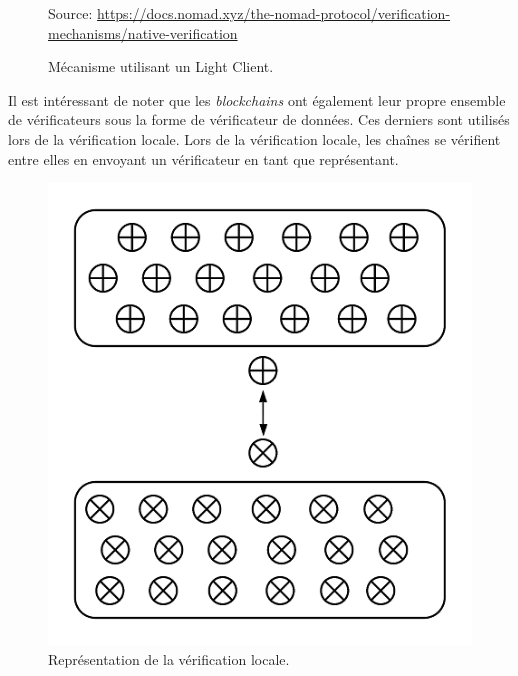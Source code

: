\begin{figure}[h!]
    \centering
{}
    {\scriptsize
            Source: \url{https://docs.nomad.xyz/the-nomad-protocol/verification-mechanisms/native-verification}}
    \caption{Mécanisme utilisant un Light Client.}
    \label{fig:LightClient}
\end{figure}

\pagebreak
Il est intéressant de noter que les \textit{blockchains} ont également leur propre ensemble de vérificateurs sous la forme de vérificateur de données. Ces derniers sont utilisés lors de la vérification locale. Lors de la vérification locale, les chaînes se vérifient entre elles en envoyant un vérificateur en tant que représentant.

\begin{figure}[h]
    \centering
\includegraphics[scale=0.70]{centralisation/imagesBridges/DiagrammeVerifLocale.png}
\caption{Représentation de la vérification locale.}
\label{fig:LocaleVerif}
\end{figure}

